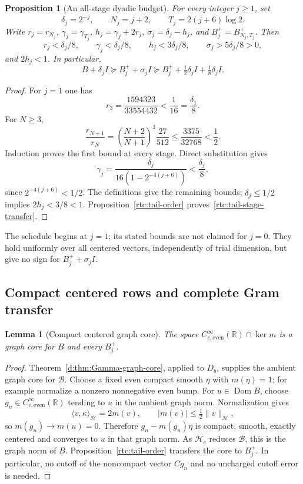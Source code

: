 \documentclass[11pt,a4paper]{article}
\numberwithin{equation}{section}
\newtheorem{proposition}[theorem]{Proposition}
\newtheorem{lemma}[theorem]{Lemma}
\theoremstyle{definition}\newtheorem{definition}[theorem]{Definition}
\theoremstyle{remark}\newtheorem{remark}[theorem]{Remark}
\newcommand{\R}{\mathbb R}\newcommand{\C}{\mathbb C}\newcommand{\N}{\mathbb N}
\newcommand{\Hh}{\mathcal H}\newcommand{\Hw}{\mathcal H}
\newcommand{\ip}[2]{\langle#1,#2\rangle}\newcommand{\norm}[1]{\lVert#1\rVert}\newcommand{\abs}[1]{\lvert#1\rvert}
\begin{document}
\begin{proposition}[An all-stage dyadic budget]\label{rtc:tail-schedule}
For every integer $j\ge1$, set
\begin{equation}\label{rtc:tail-dyadic}
 \delta_j=2^{-j},\qquad N_j=j+2,\qquad
 T_j=2(j+6)\log2.
\end{equation}
Write $r_j=r_{N_j}$, $\gamma_j=\gamma_{T_j}$,
$h_j=\gamma_j+2r_j$, $\sigma_j=\delta_j-h_j$, and
$B_j^+=B_{N_j,T_j}^+$.  Then
\begin{equation}\label{rtc:tail-all-stage}
 r_j<\delta_j/8,\qquad \gamma_j<\delta_j/8,\qquad
 h_j<3\delta_j/8,\qquad \sigma_j>5\delta_j/8>0,
\end{equation}
and $2h_j<1$.  In particular,
\begin{equation}\label{rtc:tail-stage-transfer}
 B+\delta_jI\succeq B_j^++\sigma_jI
 \succeq B_j^++\tfrac12\delta_jI+\tfrac18\delta_jI.
\end{equation}
\end{proposition}
\begin{proof}
For $j=1$ one has
\[
 r_3=\frac{1594323}{33554432}<\frac1{16}=\frac{\delta_1}{8}.
\]
For $N\ge3$,
\[
 \frac{r_{N+1}}{r_N}
 =\left(\frac{N+2}{N+1}\right)^3\frac{27}{512}
 \le\frac{3375}{32768}<\frac12.
\]
Induction proves the first bound at every stage.  Direct substitution gives
\[
 \gamma_j=\frac{\delta_j}{16(1-2^{-4(j+6)})}<\frac{\delta_j}{8},
\]
since $2^{-4(j+6)}<1/2$.  The definitions give the remaining bounds;
$\delta_j\le1/2$ implies $2h_j<3/8<1$.
Proposition~\ref{rtc:tail-order} proves~\eqref{rtc:tail-stage-transfer}.
\end{proof}
The schedule begins at $j=1$; its stated bounds are not claimed for
$j=0$.  They hold uniformly over all centered vectors, independently of
trial dimension, but give no sign for $B_j^++\sigma_jI$.

\subsection{Compact centered rows and complete Gram transfer}
\label{rtc:tail-rows-section}

\begin{lemma}[Compact centered graph core]\label{rtc:tail-core}
The space $C_{c,\mathrm{even}}^\infty(\R)\cap\ker m$ is a graph core
for $B$ and every $B_j^+$.
\end{lemma}
\begin{proof}
Theorem~\ref{d:thm:Gamma-graph-core}, applied to $D_b$, supplies the
ambient graph core for $\mathcal B$.  Choose a fixed even compact
smooth $\eta$ with $m(\eta)=1$; for example normalize a nonzero
nonnegative even bump.  For $u\in\operatorname{Dom}B$, choose
$g_n\in C_{c,\mathrm{even}}^\infty(\R)$ tending to $u$ in the
ambient graph norm.  Normalization gives
\[
 \ip{v}{\kappa}_{\Hh}=2m(v),\qquad
 |m(v)|\le\tfrac12\norm{v}_{\Hh},
\]
so $m(g_n)\to m(u)=0$.  Therefore
$g_n-m(g_n)\eta$ is compact, smooth, exactly centered and converges to
$u$ in that graph norm.  As $\Hh_c$ reduces $\mathcal B$, this is the
graph norm of $B$.  Proposition~\ref{rtc:tail-order} transfers the core
to $B_j^+$.  In particular, no cutoff of the noncompact vector $Cg_n$
and no uncharged cutoff error is needed.
\end{proof}
\end{document}
